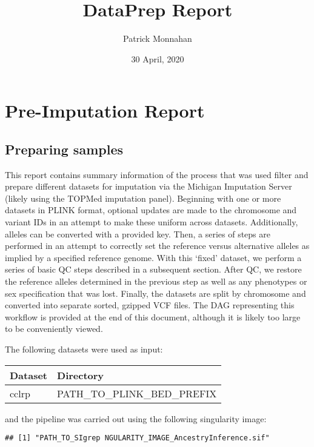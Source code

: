 \documentclass[]{article}
\title{DataPrep Report}
\author{Patrick Monnahan}
\date{30 April, 2020}
\begin{document}
\maketitle

\hypertarget{pre-imputation-report}{%
\section{Pre-Imputation Report}\label{pre-imputation-report}}

\hypertarget{preparing-samples}{%
\subsection{Preparing samples}\label{preparing-samples}}

This report contains summary information of the process that was used
filter and prepare different datasets for imputation via the Michigan
Imputation Server (likely using the TOPMed imputation panel). Beginning
with one or more datasets in PLINK format, optional updates are made to
the chromosome and variant IDs in an attempt to make these uniform
across datasets. Additionally, alleles can be converted with a provided
key. Then, a series of steps are performed in an attempt to correctly
set the reference versus alternative alleles as implied by a specified
reference genome. With this `fixed' dataset, we perform a series of
basic QC steps described in a subsequent section. After QC, we restore
the reference alleles determined in the previous step as well as any
phenotypes or sex specification that was lost. Finally, the datasets are
split by chromosome and converted into separate sorted, gzipped VCF
files. The DAG representing this workflow is provided at the end of this
document, although it is likely too large to be conveniently viewed.

The following datasets were used as input:

\begin{longtable}[]{@{}ll@{}}
\toprule
Dataset & Directory\tabularnewline
\midrule
\endhead
cclrp & PATH\_TO\_PLINK\_BED\_PREFIX\tabularnewline
\bottomrule
\end{longtable}

and the pipeline was carried out using the following singularity image:

\begin{verbatim}
## [1] "PATH_TO_SIgrep NGULARITY_IMAGE_AncestryInference.sif"
\end{verbatim}
\end{document}
